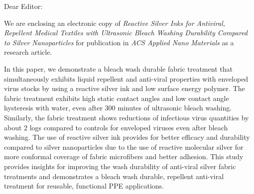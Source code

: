 \documentclass[11pt]{letter}
\date{\today}
\begin{document}
\begin{letter}{}


\opening{Dear Editor:}
 We are enclosing an electronic copy of \textit{Reactive Silver Inks for Antiviral, Repellent Medical Textiles with Ultrasonic Bleach Washing Durability Compared to Silver Nanoparticles}
for publication in %
\textit{ACS Applied Nano Materials} as a research article.


In this paper, we demonstrate a bleach wash durable 
fabric treatment that simultaneously exhibits liquid repellent and anti-viral properties with enveloped virus stocks by using a reactive silver ink and low surface energy polymer. %
The fabric treatment 
exhibits high static contact angles and low contact angle hysteresis with water, even after 300 minutes of ultrasonic bleach washing. Similarly, the fabric treatment shows reductions of infectious virus quantities by about 2 logs compared to controls for enveloped viruses even after bleach washing. The use of reactive silver ink provides for 
better efficacy and durability compared to silver nanoparticles due to the use of reactive molecular silver for more conformal coverage of fabric microfibers and better adhesion.  This study provides insights for improving the wash durability of anti-viral silver fabric treatments and demonstrates a bleach wash durable, repellent anti-viral treatment for reusable, functional PPE applications. 


\end{letter}
\end{document}
